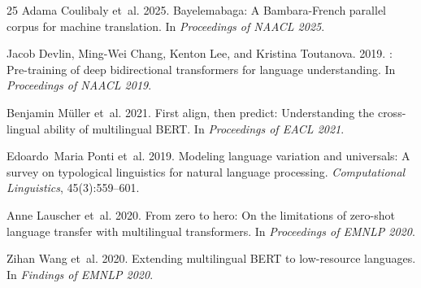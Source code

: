 \documentclass[11pt]{article}
\begin{document}
\begin{thebibliography}{25}
Adama Coulibaly et~al. 2025.
\newblock Bayelemabaga: A {Bambara}-{French} parallel corpus for machine translation.
\newblock In \emph{Proceedings of NAACL 2025}.

Jacob Devlin, Ming-Wei Chang, Kenton Lee, and Kristina Toutanova. 2019.
: Pre-training of deep bidirectional transformers for language understanding.
\newblock In \emph{Proceedings of NAACL 2019}.

Benjamin M\"{u}ller et~al. 2021.
\newblock First align, then predict: Understanding the cross-lingual ability of multilingual {BERT}.
\newblock In \emph{Proceedings of EACL 2021}.

Edoardo~Maria Ponti et~al. 2019.
\newblock Modeling language variation and universals: A survey on typological linguistics for natural language processing.
\newblock \emph{Computational Linguistics}, 45(3):559--601.

Anne Lauscher et~al. 2020.
\newblock From zero to hero: On the limitations of zero-shot language transfer with multilingual transformers.
\newblock In \emph{Proceedings of EMNLP 2020}.

Zihan Wang et~al. 2020.
\newblock Extending multilingual {BERT} to low-resource languages.
\newblock In \emph{Findings of EMNLP 2020}.

\end{thebibliography}
\end{document}

